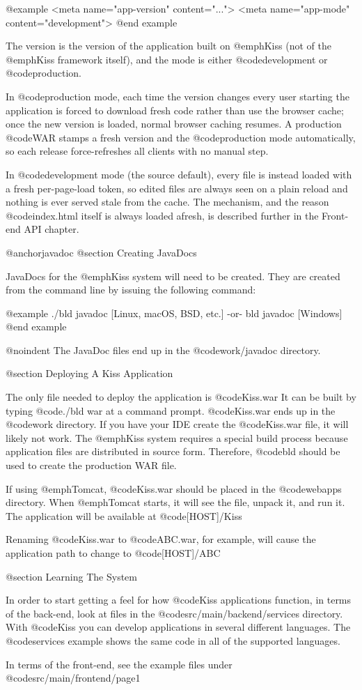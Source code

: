 @example
<meta name="app-version" content="...">
<meta name="app-mode" content="development">
@end example

The version is the version of the application built on @emph{Kiss} (not
of the @emph{Kiss} framework itself), and the mode is either
@code{development} or @code{production}.

In @code{production} mode, each time the version changes every user
starting the application is forced to download fresh code rather than
use the browser cache; once the new version is loaded, normal browser
caching resumes.  A production @code{WAR} stamps a fresh version and
the @code{production} mode automatically, so each release
force-refreshes all clients with no manual step.

In @code{development} mode (the source default), every file is instead
loaded with a fresh per-page-load token, so edited files are always
seen on a plain reload and nothing is ever served stale from the
cache.  The mechanism, and the reason @code{index.html} itself is
always loaded afresh, is described further in the Front-end API
chapter.


@anchor{javadoc} 
@section Creating JavaDocs

JavaDocs for the @emph{Kiss} system will need to be created.  They are
created from the command line by issuing the following command:

@example
./bld javadoc              [Linux, macOS, BSD, etc.]
    -or-
bld javadoc                [Windows]
@end example

@noindent
The JavaDoc files end up in the @code{work/javadoc} directory.


@section Deploying A Kiss Application

The only file needed to deploy the application is @code{Kiss.war} It
can be built by typing @code{./bld war} at a command prompt.
@code{Kiss.war} ends up in the @code{work} directory.  If you
have your IDE create the @code{Kiss.war} file, it will likely not
work.  The @emph{Kiss} system requires a special build process because
application files are distributed in source form.  Therefore, @code{bld}
should be used to create the production WAR file.

If using @emph{Tomcat}, @code{Kiss.war} should be placed in the
@code{webapps} directory.  When @emph{Tomcat} starts, it will see the
file, unpack it, and run it.  The application will be available at
@code{[HOST]/Kiss}

Renaming @code{Kiss.war} to @code{ABC.war}, for example, will cause
the application path to change to @code{[HOST]/ABC}

@section Learning The System

In order to start getting a feel for how @code{Kiss} applications
function, in terms of the back-end, look at files in the
@code{src/main/backend/services} directory.  With @code{Kiss} you can
develop applications in several different languages.  The @code{services}
example shows the same code in all of the supported languages.

In terms of the front-end, see the example files under @code{src/main/frontend/page1}
